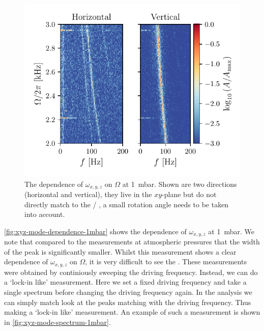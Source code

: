 \begin{figure}
    \centering
    \includegraphics{figures/data/xyz_mode_dependence_on_driving_frequency_spectrum.pdf}
    \caption{The dependence of $\omega_{x,y,z}$ on $\Omega$ at \qty{1}{\milli\bar}. Shown are two directions (horizontal and vertical), they live in the $xy$-plane but do not directly match to the \xmode / \ymode, a small rotation angle needs to be taken into account.}
    \label{fig:xyz-mode-dependence-1mbar}
\end{figure}

\autoref{fig:xyz-mode-dependence-1mbar} shows the dependence of $\omega_{x,y,z}$ at \qty{1}{\milli\bar}. We note that compared to the measurements at atmospheric pressures that the width of the peak is significantly smaller. Whilst this measurement shows a clear dependence of $\omega_{x,y,z}$ on $\Omega$, it is very difficult to see the \zmode. These measurements were obtained by continiously sweeping the driving frequency. Instead, we can do a `lock-in like' measurement. Here we set a fixed driving frequency and take a single spectrum before changing the driving frequency again. In the analysis we can simply match look at the peaks matching with the driving frequency. Thus making a `lock-in like' measurement. An example of such a measurement is shown in \autoref{fig:xyz-mode-spectrum-1mbar}.

